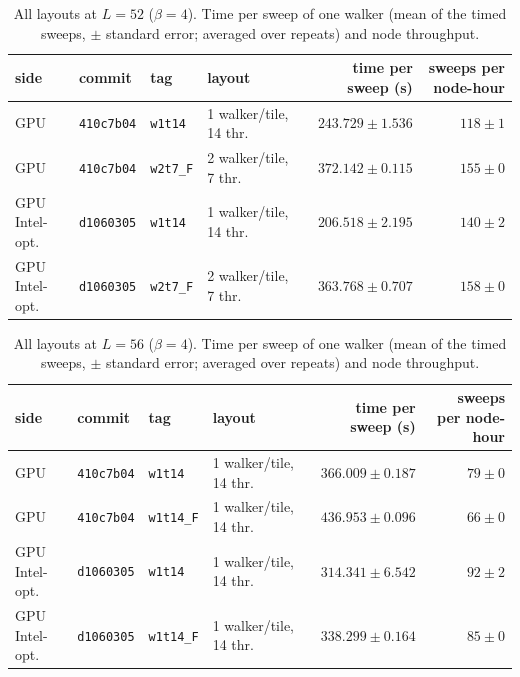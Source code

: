 \begin{table}[h]\centering\small
\caption{All layouts at $L=52$ ($\beta=4$). Time per sweep of one walker (mean of the timed sweeps, $\pm$ standard error; averaged over repeats) and node throughput.}
\begin{tabular}{@{}llllrr@{}}\toprule
side & commit & tag & layout & time per sweep (s) & sweeps per node-hour\\\midrule
GPU & \texttt{410c7b04} & \texttt{w1t14} & 1 walker/tile, 14 thr. & $243.729 \pm 1.536$ & $118 \pm 1$\\
GPU & \texttt{410c7b04} & \texttt{w2t7\_F} & 2 walker/tile, 7 thr. & $372.142 \pm 0.115$ & $155 \pm 0$\\
GPU Intel-opt. & \texttt{d1060305} & \texttt{w1t14} & 1 walker/tile, 14 thr. & $206.518 \pm 2.195$ & $140 \pm 2$\\
GPU Intel-opt. & \texttt{d1060305} & \texttt{w2t7\_F} & 2 walker/tile, 7 thr. & $363.768 \pm 0.707$ & $158 \pm 0$\\
\bottomrule\end{tabular}\end{table}
\begin{table}[h]\centering\small
\caption{All layouts at $L=56$ ($\beta=4$). Time per sweep of one walker (mean of the timed sweeps, $\pm$ standard error; averaged over repeats) and node throughput.}
\begin{tabular}{@{}llllrr@{}}\toprule
side & commit & tag & layout & time per sweep (s) & sweeps per node-hour\\\midrule
GPU & \texttt{410c7b04} & \texttt{w1t14} & 1 walker/tile, 14 thr. & $366.009 \pm 0.187$ & $79 \pm 0$\\
GPU & \texttt{410c7b04} & \texttt{w1t14\_F} & 1 walker/tile, 14 thr. & $436.953 \pm 0.096$ & $66 \pm 0$\\
GPU Intel-opt. & \texttt{d1060305} & \texttt{w1t14} & 1 walker/tile, 14 thr. & $314.341 \pm 6.542$ & $92 \pm 2$\\
GPU Intel-opt. & \texttt{d1060305} & \texttt{w1t14\_F} & 1 walker/tile, 14 thr. & $338.299 \pm 0.164$ & $85 \pm 0$\\
\bottomrule\end{tabular}\end{table}
